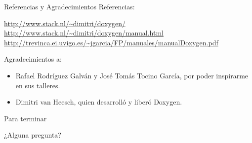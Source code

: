 \documentclass[12pt,xcolor=svgnames]{beamer}
\begin{document}
\begin{frame}{Referencias y Agradecimientos}
  Referencias:
  \vspace*{0.2cm}
  {\scriptsize
  \begin{thebibliography}{6}
  \bibitem{} \url{http://www.stack.nl/~dimitri/doxygen/}
  \bibitem{} \url{http://www.stack.nl/~dimitri/doxygen/manual.html}
  \bibitem{} \url{http://trevinca.ei.uvigo.es/~jgarcia/FP/manuales/manualDoxygen.pdf}
  \end{thebibliography}
  }
  \vspace*{1cm}
  Agradecimientos a:
  \begin{itemize}
  \item Rafael Rodríguez Galván y José Tomás Tocino García, por poder
    inspirarme en sus talleres.
  \item Dimitri van Heesch, quien desarrolló y liberó Doxygen.
  \end{itemize}


\end{frame}

\begin{frame}{Para terminar}
  \begin{center}
    {\Large ¿Alguna pregunta?}
  \end{center}
\end{frame}

\licencia
\end{document}
